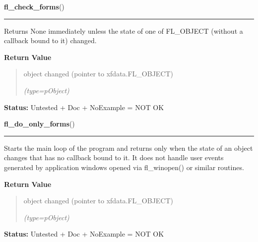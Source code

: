     \label{xformslib:library:fl_check_forms}

    \vspace{0.5ex}

\hspace{.8\funcindent}\begin{boxedminipage}{\funcwidth}

    \raggedright \textbf{fl\_check\_forms}()

    \vspace{-1.5ex}

    \rule{\textwidth}{0.5\fboxrule}
\setlength{\parskip}{2ex}
    Returns None immediately unless the state of one of FL\_OBJECT (without
    a callback bound to it) changed.

\setlength{\parskip}{1ex}
      \textbf{Return Value}
    \vspace{-1ex}

      \begin{quote}
      object changed (pointer to xfdata.FL\_OBJECT)

      {\it (type=pObject)}

      \end{quote}

\textbf{Status:} Untested + Doc + NoExample = NOT OK



    \end{boxedminipage}

    \label{xformslib:library:fl_do_only_forms}

    \vspace{0.5ex}

\hspace{.8\funcindent}\begin{boxedminipage}{\funcwidth}

    \raggedright \textbf{fl\_do\_only\_forms}()

    \vspace{-1.5ex}

    \rule{\textwidth}{0.5\fboxrule}
\setlength{\parskip}{2ex}
    Starts the main loop of the program and returns only when the state of 
    an object changes that has no callback bound to it. It does not handle 
    user events generated by application windows opened via fl\_winopen() 
    or similar routines.

\setlength{\parskip}{1ex}
      \textbf{Return Value}
    \vspace{-1ex}

      \begin{quote}
      object changed (pointer to xfdata.FL\_OBJECT)

      {\it (type=pObject)}

      \end{quote}

\textbf{Status:} Untested + Doc + NoExample = NOT OK



    \end{boxedminipage}

